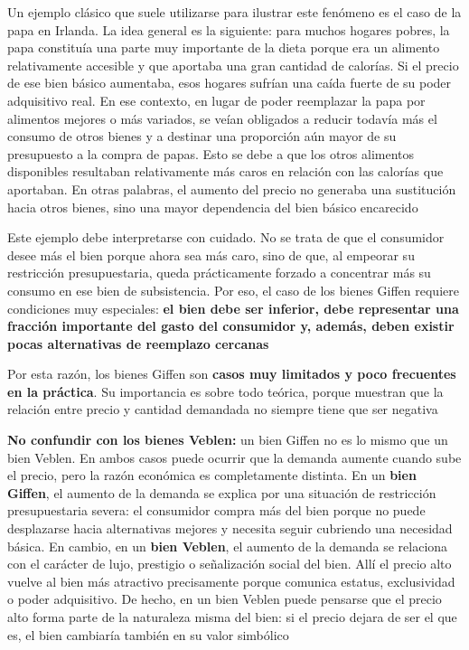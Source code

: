 \documentclass{article}
\begin{document}
Un ejemplo clásico que suele utilizarse para ilustrar este fenómeno es el caso de la papa en Irlanda. La idea general es la siguiente: para muchos hogares pobres, la papa constituía una parte muy importante de la dieta porque era un alimento relativamente accesible y que aportaba una gran cantidad de calorías. Si el precio de ese bien básico aumentaba, esos hogares sufrían una caída fuerte de su poder adquisitivo real. En ese contexto, en lugar de poder reemplazar la papa por alimentos mejores o más variados, se veían obligados a reducir todavía más el consumo de otros bienes y a destinar una proporción aún mayor de su presupuesto a la compra de papas. Esto se debe a que los otros alimentos disponibles resultaban relativamente más caros en relación con las calorías que aportaban. En otras palabras, {\color{teal}el aumento del precio no generaba una sustitución hacia otros bienes, sino una mayor dependencia del bien básico encarecido}

Este ejemplo debe interpretarse con cuidado. No se trata de que el consumidor desee más el bien porque ahora sea más caro, sino de que, al empeorar su restricción presupuestaria, queda prácticamente forzado a concentrar más su consumo en ese bien de subsistencia. Por eso, el caso de los bienes Giffen requiere condiciones muy especiales: \textbf{\color{teal}el bien debe ser inferior, debe representar una fracción importante del gasto del consumidor y, además, deben existir pocas alternativas de reemplazo cercanas}

Por esta razón, los bienes Giffen son \textbf{\color{teal}casos muy limitados y poco frecuentes en la práctica}. Su importancia es sobre todo teórica, porque muestran que la relación entre precio y cantidad demandada no siempre tiene que ser negativa

\textbf{No confundir con los bienes Veblen:} un bien Giffen no es lo mismo que un bien Veblen. En ambos casos puede ocurrir que la demanda aumente cuando sube el precio, pero la razón económica es completamente distinta. En un \textbf{\color{teal}bien Giffen}, el aumento de la demanda se explica por una situación de restricción presupuestaria severa: el consumidor compra más del bien porque no puede desplazarse hacia alternativas mejores y necesita seguir cubriendo una necesidad básica. En cambio, en un \textbf{\color{teal}bien Veblen}, el aumento de la demanda se relaciona con el carácter de lujo, prestigio o señalización social del bien. Allí el precio alto vuelve al bien más atractivo precisamente porque comunica estatus, exclusividad o poder adquisitivo. De hecho, en un bien Veblen puede pensarse que el precio alto forma parte de la naturaleza misma del bien: si el precio dejara de ser el que es, el bien cambiaría también en su valor simbólico
\end{document}
